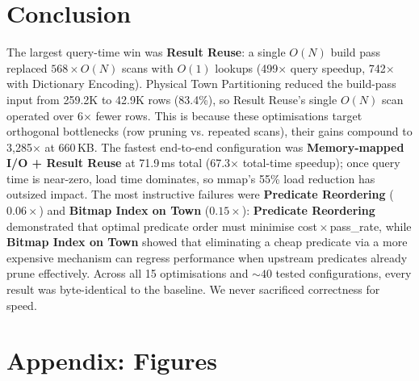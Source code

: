 \documentclass[11pt,a4paper]{article}
\begin{document}
\section{Conclusion}\label{sec:conclusion}
The largest query-time win was \textbf{Result Reuse}: a single $O(N)$ build pass replaced $568 \times O(N)$ scans with $O(1)$ lookups (499$\times$ query speedup, 742$\times$ with Dictionary Encoding).
Physical Town Partitioning reduced the build-pass input from 259.2K to 42.9K rows (83.4\%), so Result Reuse's single $O(N)$ scan operated over 6$\times$ fewer rows.
This is because these optimisations target orthogonal bottlenecks (row pruning vs. repeated scans), their gains compound to 3{,}285$\times$ at 660\,KB.
The fastest end-to-end configuration was \textbf{Memory-mapped I/O + Result Reuse} at 71.9\,ms total (67.3$\times$ total-time speedup); once query time is near-zero, load time dominates, so mmap's 55\% load reduction has outsized impact.
The most instructive failures were \textbf{Predicate Reordering} ($0.06\times$) and \textbf{Bitmap Index on Town} ($0.15\times$): \textbf{Predicate Reordering} demonstrated that optimal predicate order must minimise cost\,$\times$\,pass\_rate, while \textbf{Bitmap Index on Town} showed that eliminating a cheap predicate via a more expensive mechanism can regress performance when upstream predicates already prune effectively.
Across all 15 optimisations and ${\sim}40$ tested configurations, every result was byte-identical to the baseline.
We never sacrificed correctness for speed.

\newpage
\section{Appendix: Figures}
\vspace{-1.0cm}
\end{document}
